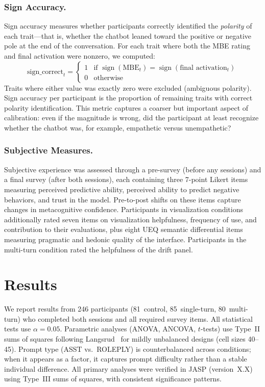 \subsubsection{Sign Accuracy.}
Sign accuracy measures whether participants correctly identified the
\emph{polarity} of each trait---that is, whether the chatbot leaned
toward the positive or negative pole at the end of the conversation.
For each trait where both the MBE rating and final activation were
nonzero, we computed:
\[
    \text{sign\_correct}_t =
    \begin{cases}
        1 & \text{if } \operatorname{sign}(\text{MBE}_t) =
            \operatorname{sign}(\text{final activation}_t) \\
        0 & \text{otherwise}
    \end{cases}
\]
Traits where either value was exactly zero were excluded (ambiguous
polarity). Sign accuracy per participant is the proportion of
remaining traits with correct polarity identification. This metric
captures a coarser but important aspect of calibration: even if the
magnitude is wrong, did the participant at least recognize whether the
chatbot was, for example, empathetic versus unempathetic?

\subsubsection{Subjective Measures.}
Subjective experience was assessed through a pre-survey (before any
sessions) and a final survey (after both sessions), each containing
three 7-point Likert items measuring perceived predictive ability,
perceived ability to predict negative behaviors, and trust in the model.
Pre-to-post shifts on these items capture changes in metacognitive
confidence. Participants in visualization conditions additionally rated
seven items on visualization helpfulness, frequency of use, and
contribution to their evaluations, plus eight UEQ semantic differential
items measuring pragmatic and hedonic quality of the interface.
Participants in the multi-turn condition rated the helpfulness of the
drift panel.


\section{Results}

We report results from 246 participants (81~control, 85~single-turn,
80~multi-turn) who completed both sessions and all required survey
items. All statistical tests use $\alpha = 0.05$. Parametric analyses
(ANOVA, ANCOVA, $t$-tests) use Type~II sums of squares following
Langsrud~\cite{langsrud2003} for mildly unbalanced designs (cell sizes
40--45). Prompt type (ASST vs.\ ROLEPLY) is counterbalanced across
conditions; when it appears as a factor, it captures prompt difficulty
rather than a stable individual difference. All primary analyses were
verified in JASP (version~X.X) using Type~III sums of squares, with
consistent significance patterns.

